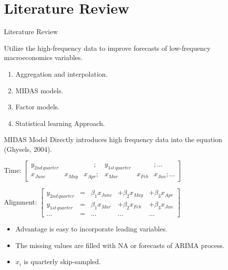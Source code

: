 \documentclass[14pt,xcolor=dvipsnames]{beamer}
\begin{document}
\section{Literature Review}


\begin{frame}{Literature Review}

Utilize the high-frequency data to improve forecasts of low-frequency macroeconomics variables. 

\begin{enumerate}%
\item Aggregation and interpolation.
\item MIDAS models.
\item Factor models.
\item Statistical learning  Approach.
\end{enumerate}
\end{frame}


\begin{frame}{MIDAS Model}
Directly introduces high frequency data into the equation (Ghysels, 2004). 
\begin{block}{}
\begin{center}
Time:	$\begin{bmatrix}
	y_{2nd \, quarter}  &  & \,\,\,\quad ;& y_{1st \, quarter} & &;... \\
	x_{June} & x_{May} & x_{Apr}; & x_{Mar} & x_{Feb} & x_{Jan};...
	\end{bmatrix}$
	
Alignment:	$\begin{bmatrix}	
	
	y_{2nd \, quarter} & = & \beta_{1} x_{June} &+ \beta_{2} x_{May} &+ \beta_{3} x_{Apr}\\
	y_{1st \, quarter} & = & \beta_{1} x_{Mar} &+ \beta_{2} x_{Feb} &+ \beta_{3} x_{Jan}\\
	... & = & ... &...& ...	
	\end{bmatrix}$\\
\end{center}
\end{block}

\begin{itemize}
	\item Advantage is easy to incorporate leading variables. \\
	\item The missing values are filled with NA or forecasts of ARIMA process. \\
	\item $x_i$ is quarterly skip-sampled. 
\end{itemize}

\end{frame}
\end{document}
